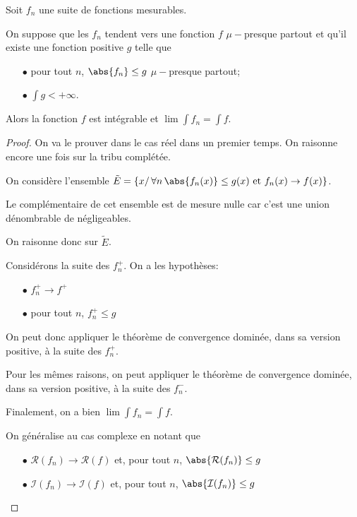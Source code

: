 \begin{theo}
Soit $f_n$ une suite de fonctions mesurables.

On suppose que les $f_n$ tendent vers une fonction $f$ $\mu-$presque partout et qu'il existe une fonction positive $g$ telle que
\begin{itemize}
\item[$\bullet$] pour tout $n$, $\abs{f_n} \leq g$ $\mu-$presque partout;
\item[$\bullet$] $\displaystyle{\int} g < +\infty$.
\end{itemize}

Alors la fonction $f$ est intégrable et $\lim \displaystyle{\int} f_n = \displaystyle{\int} f$.
\end{theo}


\begin{proof}
On va le prouver dans le cas réel dans un premier temps. On raisonne encore une fois sur la tribu complétée.

On considère l'ensemble $\tilde{E} = \left\{x/ \,\forall n \,  \abs{f_n(x)} \leq g(x) \text{ et } f_n(x) \to f(x)\right\}$.

Le complémentaire de cet ensemble est de mesure nulle car c'est une union dénombrable de négligeables.

On raisonne donc sur $\tilde{E}$. 

Considérons la suite des $f_n^{+}$. On a les hypothèses:
\begin{itemize}
\item[$\bullet$] $f_n^{+} \to f^{+}$
\item[$\bullet$] pour tout $n$, $f_n^{+} \leq g$
\end{itemize}

On peut donc appliquer le théorème de convergence dominée, dans sa version positive, à la suite des $f_n^{+}$.

Pour les mêmes raisons, on peut appliquer le théorème de convergence dominée, dans sa version positive, à la suite des $f_n^{-}$.

Finalement, on a bien $\lim \displaystyle{\int} f_n = \displaystyle{\int} f$.

On généralise au cas complexe en notant que 
\begin{itemize}
\item[$\bullet$]  $\mathcal{R}(f_n) \to \mathcal{R}(f)$ et, pour tout $n$, $\abs{\mathcal{R}(f_n)} \leq g$
\item[$\bullet$]  $\mathcal{I}(f_n) \to \mathcal{I}(f)$ et, pour tout $n$, $\abs{\mathcal{I}(f_n)} \leq g$
\end{itemize}
\end{proof}

%
%

